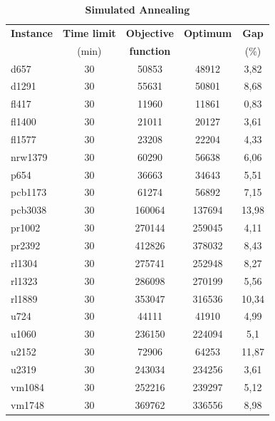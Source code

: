 \begin{table}[h!]
	\begin{center}
		\caption{\textbf{\large Simulated Annealing}}
		\begin{tabular}{l|c|c|c|c}
			\textbf{Instance} & \textbf{Time limit} & \textbf{Objective} & \textbf{Optimum} & \textbf{ Gap } \\
			& (min) & \textbf{function} & & (\%)\\
			\hline
			d657		&	30	&	50853	&	48912	&	3,82	\\
			d1291	&	30	&	55631	&	50801	&	8,68	\\
			fl417	&	30	&	11960	&	11861	&	0,83	\\
			fl1400	&	30	&	21011	&	20127	&	3,61	\\
			fl1577	&	30	&	23208	&	22204	&	4,33	\\
			nrw1379	&	30	&	60290	&	56638	&	6,06	\\
			p654		&	30	&	36663	&	34643	&	5,51	\\
			pcb1173	&	30	&	61274	&	56892	&	7,15	\\
			pcb3038	&	30	&	160064	&	137694	&	13,98	\\
			pr1002	&	30	&	270144	&	259045	&	4,11	\\
			pr2392	&	30	&	412826	&	378032	&	8,43	\\
			rl1304	&	30	&	275741	&	252948	&	8,27	\\
			rl1323	&	30	&	286098	&	270199	&	5,56	\\
			rl1889	&	30	&	353047	&	316536	&	10,34	\\
			u724		&	30	&	44111	&	41910	&	4,99	\\
			u1060	&	30	&	236150	&	224094	&	5,1	\\
			u2152  	&	30	&	72906	&	64253	&	11,87	\\
			u2319 	&	30	&	243034	&	234256	&	3,61	\\
			vm1084 	&	30	&	252216	&	239297	&	5,12	\\
			vm1748	&	30	&	369762	&	336556	&	8,98	\\
		\end{tabular}
	\end{center}
\end{table}

